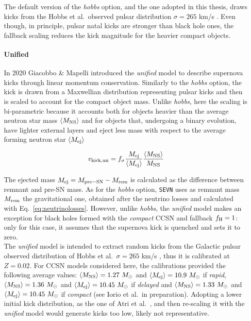 \documentclass[a4paper,titlepage]{book}     	%
\newcommand{\sun}{\ensuremath{_\odot}}
\newcommand{\msun}{\ensuremath{M\sun}}
\begin{document}
The default version of the \emph{hobbs} option, and the one adopted in this thesis, draws kicks from the Hobbs et al.\ observed pulsar distribution $\sigma = 265$ km/s \cite{Hobbs2005}. Even though, in principle, pulsar natal kicks are stronger than black hole ones, the fallback scaling reduces the kick magnitude for the heavier compact objects.

\paragraph{Unified} In 2020 Giacobbo \& Mapelli \cite{SNkicksUnified_Giacobbo2020} introduced the \emph{unified} model to describe supernova kicks through linear momentum conservation. Similarly to the \emph{hobbs} option, the kick is drawn from a Maxwellian distribution representing pulsar kicks and then is scaled to account for the compact object mass. Unlike \emph{hobbs}, here the scaling is bi-parametric because it accounts both for objects heavier than the average neutron star mass $\langle M_{\rm NS}\rangle $ and for objects that, undergoing a binary evolution, have lighter external layers and eject less mass with respect to the average forming neutron star $\langle M_{\rm ej}\rangle$

\begin{equation}\label{eq:kickunified}
    v_{\rm kick, un} = f_{\sigma} \frac{M_{\rm ej}}{\langle M_{\rm ej}\rangle} \frac{\langle M_{\rm NS}\rangle}{M_{\rm NS}}
\end{equation}

The ejected mass $M_{\rm ej} = M_{\rm pre-SN} - M_{\rm rem}$ is calculated as the difference between remnant and pre-SN mass. As for the \emph{hobbs} option, \texttt{SEVN} uses as remnant mass $M_{\rm rem}$ the gravitational one, obtained after the neutrino losses and calculated with Eq.\ \ref{eq:neutrinolosses}. However, unlike \emph{hobbs}, the \emph{unified} model makes an exception for black holes formed with the \emph{compact} CCSN and fallback $f_{\rm H}=1$: only for this case, it assumes that the supernova kick is quenched and sets it to zero.\\

The \emph{unified} model is intended to extract random kicks from the Galactic pulsar observed distribution of Hobbs et al.\ $\sigma = 265$ km/s \cite{Hobbs2005}, thus it is calibrated at $Z=0.02$. For CCSN models considered here, the calibrations provided the following average values: $\langle M_{\rm NS}\rangle = 1.27~\msun$ and $\langle M_{\rm ej}\rangle = 10.9~\msun$ if \emph{rapid}, $\langle M_{\rm NS}\rangle = 1.36~\msun$ and $\langle M_{\rm ej}\rangle = 10.45~\msun$ if \emph{delayed} and $\langle M_{\rm NS}\rangle = 1.33~\msun$ and $\langle M_{\rm ej}\rangle = 10.45~\msun$ if \emph{compact} (see Iorio et al.\ in preparation). Adopting a lower initial kick distribution, as the one of Atri et al.\ \cite{Atri2019_kicks}, and then re-scaling it with the \emph{unified} model would generate kicks too low, likely not representative. 
\end{document}
